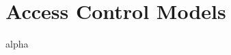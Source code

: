 \documentclass{hsrthesis}
\begin{document}
%

\tableofcontents

\newpage

\chapter{Access Control Models}



%
%
%
% 


\listoffigures
\printglossary[style=altlist,title=Glossar]

 {alpha}



%
\end{document}
